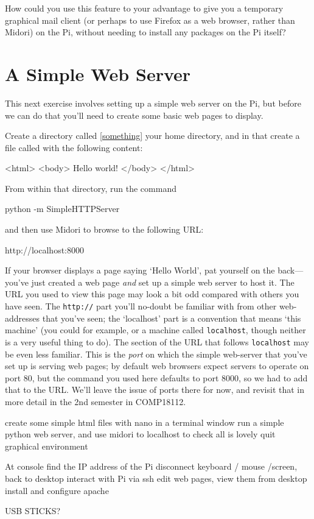 How could you use this feature to your advantage to give you a temporary graphical mail client (or perhaps to use Firefox as a web browser, rather than Midori) on the Pi, without needing to install any packages on the Pi itself?

\section{A Simple Web Server}

This next exercise involves setting up a simple web server on the Pi, but before we can do that you'll need to create some basic web pages to display. 

Create a directory called \ref{something} your home directory, and in that create a file called  with the following content:

\begin{ttoutenv}
<html>
<body>
Hello world!
</body>
</html>
\end{ttoutenv}

From within that directory, run the command

\begin{ttoutenv}
python -m SimpleHTTPServer
\end{ttoutenv}

and then use Midori to browse to the following URL:

\begin{ttoutenv}
http://localhost:8000
\end{ttoutenv}

If your browser displays a page saying `Hello World', pat yourself on the back---you've just created a web page \textit{and} set up a simple web server to host it. The URL you used to view this page may look a bit odd compared with others you have seen. The \texttt{http://} part you'll no-doubt be familiar with from other web-addresses that you've seen; the `localhost' part is a convention that means `this machine' (you could for example,  or  a machine called \texttt{localhost}, though neither is a very useful thing to do). The section of the URL that follows \texttt{localhost} may be even less familiar. This is the \textit{port} on which the simple web-server that you've set up is serving web pages; by default web browsers expect servers to operate on port 80, but the  command you used here defaults to port 8000, so we had to add that to the URL. We'll leave the issue of ports there for now, and revisit that in more detail in the 2nd semester in COMP18112. 



create some simple html files with nano in a terminal window
run a simple python web server, and use midori to localhost to check all is lovely
quit graphical environment

At console
find the IP address of the Pi
disconnect keyboard / mouse /screen, back to desktop
interact with Pi via ssh
edit web pages, view them from desktop
install and configure apache

USB STICKS?

